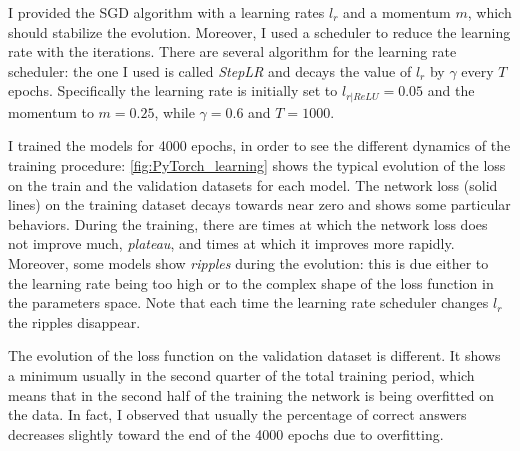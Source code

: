 I provided the \ac{SGD} algorithm with a learning rates $l_r$ and a momentum $m$, which should stabilize the evolution.
Moreover, I used a scheduler to reduce the learning rate with the iterations.
There are several algorithm for the learning rate scheduler: the one I used is called \textit{StepLR} and decays the value of $l_r$ by $\gamma$ every $T$ epochs. 
Specifically the learning rate is initially set to $l_{r|ReLU} = \num{0.05}$ and the momentum to $m=0.25$, while $\gamma = 0.6$ and $T=1000$.

I trained the models for \num{4000} epochs, in order to see the different dynamics of the training procedure: \autoref{fig:PyTorch_learning} shows the typical evolution of the loss on the train and the validation datasets for each model.
The network loss (solid lines) on the training dataset decays towards near zero and shows some particular behaviors.
During the training, there are times at which the network loss does not improve much, \textit{plateau}, and times at which it improves more rapidly.
Moreover, some models show \textit{ripples} during the evolution: this is due either to the learning rate being too high or to the complex shape of the loss function in the parameters space.
Note that each time the learning rate scheduler changes $l_r$ the ripples disappear.

The evolution of the loss function on the validation dataset is different.
It shows a minimum usually in the second quarter of the total training period, which means that in the second half of the training the network is being overfitted on the data.
In fact, I observed that usually the percentage of correct answers decreases slightly toward the end of the \num{4000} epochs due to overfitting.

%


